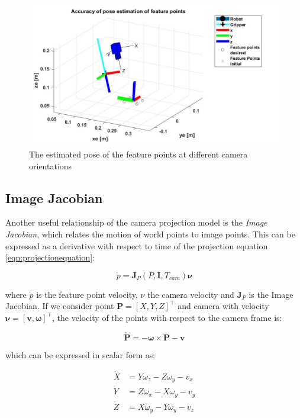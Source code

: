 \documentclass{UoNMCHA}
\numberwithin{equation}{section}
\begin{document}
\begin{figure}[H]
	\begin{center}
		\includegraphics[width=.9\linewidth]{Figures/poseestimationvalidation}
		\caption{The estimated pose of the feature points at different camera orientations}
		\label{fig:estimatedposevalidation}
	\end{center}
\end{figure}

\subsection{Image Jacobian}\label{Image Jacobian}

Another useful relationship of the camera projection model is the \textit{Image Jacobian}, which relates the motion of world points to image points. This can be expressed as a derivative with respect to time of the projection equation \ref{eqn:projectionequation}: 


\begin{equation}
\dot{p} = \mathbf{J}_{P}(P,\mathbf{I},T_{cam})\mathbf{\nu}
\end{equation}

where $\dot{p}$ is the feature point velocity, $\nu$ the camera velocity and $\mathbf{J}_{P}$ is the Image Jacobian. If we consider point $\mathbf{P} = [X, Y, Z]^\top$ and camera with velocity $\mathbf{\nu} = [\mathbf{v} , \mathbf{\omega}]^{\top}$, the velocity of the points with respect to the camera frame is:

\begin{equation*}
\dot{\mathbf{P}} = \mathbf{-\omega \times  P - v}
\end{equation*}

which can be expressed in scalar form as:

\begin{equation} \label{eqn:ScalarForm}
\begin{aligned}
\dot{X} & = Y\omega_{z} - Z\omega_{y} - v_{x} \\
\dot{Y} & = Z\omega_{x} - X\omega_{y} - v_{y} \\
\dot{Z} & = X\omega_{y} - Y\omega_{y} - v_{z}
\end{aligned}
\end{equation}
\end{document}
